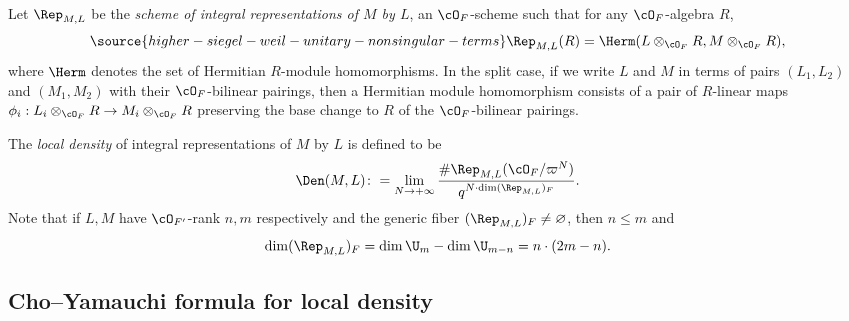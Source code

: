 Let $\Rep_{M,L}$ be the \emph{scheme of integral representations of $M$ by $L$}, an $\cO_F$-scheme such that for any $\cO_F$-algebra $R$,
\begin{align*}\label{def: Rep}
\source{higher-siegel-weil-unitary-nonsingular-terms}
\Rep_{M,L}(R)=\Herm(L \otimes_{\cO_F}R, M \otimes_{\cO_F}R),
\end{align*}
where $\Herm$ denotes the set of Hermitian $R$-module homomorphisms. In the split case, if we write $L$ and $M$ in terms of pairs $(L_1,L_2)$ and $(M_1,M_2)$ with their $\cO_{F}$-bilinear pairings, then a  Hermitian module homomorphism consists of a pair of $R$-linear maps $\phi_i:L_i \otimes_{\cO_F}R\to M_i \otimes_{\cO_F}R $ preserving the base change to $R$ of the $\cO_{F}$-bilinear pairings.

The \emph{local density} of integral representations of $M$ by $L$ is defined to be $$\Den(M,L)\colon= \lim_{N\rightarrow +\infty}\frac{\#\Rep_{M,L}(\cO_F/\varpi^N)}{q^{N\cdot\dim (\Rep_{M,L})_{F}}}.$$ Note that if $L, M$ have $\cO_{F'}$-rank $n, m$ respectively and the generic fiber $(\Rep_{M,L})_{F}\ne\varnothing$, then $n\le m$ and
\begin{equation*}
\dim (\Rep_{M,L})_{F}=\dim \U_m-\dim \U_{m-n}= n\cdot (2m-n).
\end{equation*}

\subsection{Cho--Yamauchi formula for local density}\label{ssec: Cho-Yamauchi}


%
%

